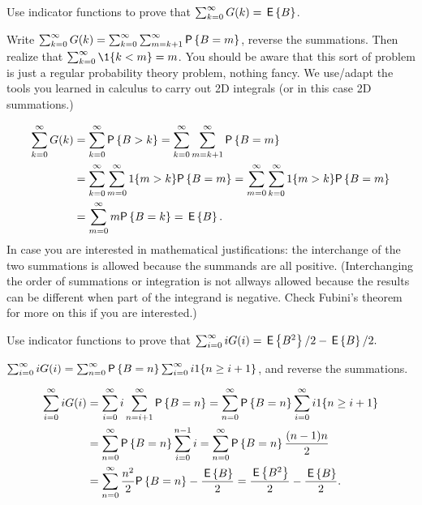 \begin{exercise}\label{ex:6}
 Use indicator functions to prove that $ \sum_{k=0}^\infty G(k) = \,\mathsf{E}\left\{B\right\}$.
    \begin{hint}
Write 
$\sum_{k=0}^\infty G(k) = \sum_{k=0}^\infty \sum_{m=k+1}^\infty \P{B=m}$, reverse the summations. Then realize that $\sum_{k=0}^\infty \1{k<m} = m$. 
You should be aware that this sort of problem is just a regular probability
  theory problem, nothing fancy. We use/adapt the tools you learned in
  calculus to carry out 2D integrals (or in this case 2D summations.)
    \end{hint}
\begin{solution}
\begin{align*}
\sum_{k=0}^\infty G(k) 
&= \sum_{k=0}^\infty \P{B>k} 
= \sum_{k=0}^\infty \sum_{m=k+1}^\infty \P{B=m}  \\
& = \sum_{k=0}^\infty \sum_{m=0}^\infty 1\{m>k\} \P{B=m} 
= \sum_{m=0}^\infty \sum_{k=0}^\infty 1 \{m>k\} \P{B=m} \\
&= \sum_{m=0}^\infty m\P{B=k} = \E B.
\end{align*}
In case you are interested in mathematical justifications: the
interchange of the two summations is allowed because the summands are
all positive. (Interchanging the order of summations or integration is
not allways allowed because the results can be different when part of
the integrand is negative. Check Fubini's theorem for more on this if
you are interested.)
\end{solution}
\end{exercise}

\begin{exercise}\label{ex:66}
 Use indicator functions to prove that
$\sum_{i=0}^\infty i G(i) =  \,\mathsf{E}\left\{B^2\right\}/2 - \,\mathsf{E}\left\{B\right\}/2.$
    \begin{hint}
$\sum_{i=0}^\infty i G(i) = \sum_{n=0}^\infty \P{B=n} \sum_{i=0}^\infty i 1\{n\geq i+1\}$,
and reverse the summations.
    \end{hint}
\begin{solution}
\begin{align*}
\sum_{i=0}^\infty i G(i)
&= \sum_{i=0}^\infty i \sum_{n=i+1}^\infty \P{B=n} = \sum_{n=0}^\infty \P{B=n} \sum_{i=0}^\infty i 1\{n\geq i+1\} \\
&= \sum_{n=0}^\infty \P{B=n} \sum_{i=0}^{n-1}i  = \sum_{n=0}^\infty \P{B=n} \frac{(n-1)n}{2} \\
&= \sum_{n=0}^\infty  \frac{n^2}{2} \P{B=n} - \frac{\E B}{2}
= \frac{\E{B^2}}{2} - \frac{\E B}{2}.
\end{align*}
\end{solution}
\end{exercise}


